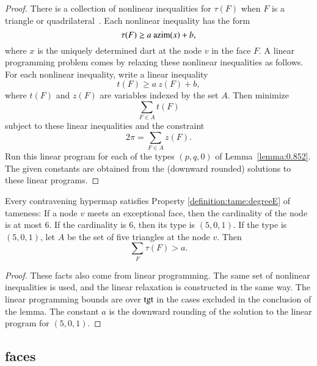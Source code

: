 \begin{proof} There is a collection of nonlinear inequalities
for $\tau(F)$ when $F$ is a triangle or quadrilateral~\cite[FUSDSPJ]{hales:2009:nonlinear}. Each nonlinear inequality has the form
$$\tau(F) \ge a~{\operatorname{azim}}(x) + b,$$
where $x$ is the uniquely determined dart at the node $v$ in the face $F$.  A linear programming problem comes by relaxing these nonlinear inequalities as follows.  For each nonlinear inequality,  write a linear inequality
$$
t(F) \ge a~z(F) + b,
$$
where $t(F)$ and $z(F)$ are variables indexed by the set $A$.
Then  minimize 
$$\sum_{F\in A} t(F)$$
subject to these linear inequalities and the constraint
$$
2\pi = \sum_{F\in A} z(F).
$$
Run this linear program for each of the types $(p,q,0)$ of Lemma~\ref{lemma:0.852}. The given constants are obtained from the (downward rounded) solutions to these linear programs.
\end{proof}

\begin{lemma}\label{lemma:deg5}
Every contravening hypermap satisfies Property
\ref{definition:tame:degreeE} of tameness: If a node $v$ meets an
exceptional face, then the cardinality of the node is at most $6$.
If the cardinality is $6$, then its type is $(5,0,1)$.
If the type is $(5,0,1)$, let $A$ be the set of five triangles at the
node $v$.  Then
$$
\sum_F \tau(F) > a.
$$
\end{lemma}

\begin{proof} These facts also come from linear programming.
The same set of nonlinear inequalities is used, and the linear
relaxation is constructed in the same way.  The linear programming
bounds are over ${\operatorname{tgt}}$ in the cases excluded in the conclusion
of the lemma.  The constant $a$ is the downward rounding of the solution to the linear program for $(5,0,1)$.
\end{proof}


\subsection{faces}



